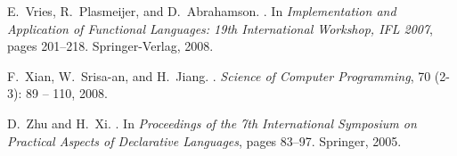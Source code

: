 \documentclass[9pt,natbib]{sigplanconf}
\begin{document}
\begin{thebibliography}{18}
E.~Vries, R.~Plasmeijer, and D.~Abrahamson.
.
\newblock In \emph{Implementation and Application of Functional Languages: 19th
  International Workshop, IFL 2007}, pages 201--218. Springer-Verlag, 2008.

F.~Xian, W.~Srisa-an, and H.~Jiang.
.
\newblock \emph{Science of Computer Programming}, 70 (2-3):
  89 -- 110, 2008.

D.~Zhu and H.~Xi.
.
\newblock In \emph{Proceedings of the 7th International Symposium on Practical
  Aspects of Declarative Languages}, pages 83--97. Springer, 2005.

\end{thebibliography}
\end{document}
